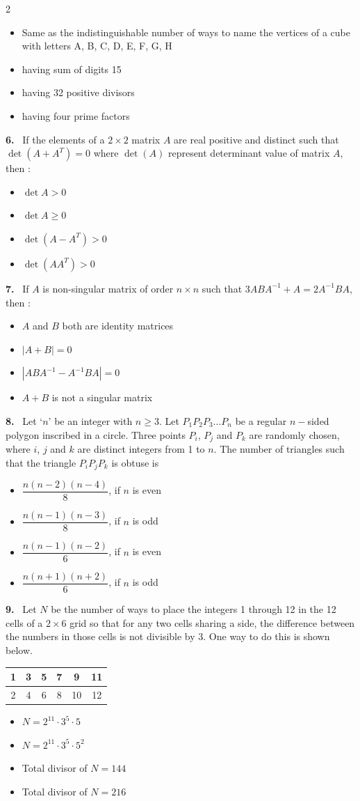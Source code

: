 \documentclass[10pt]{extarticle}
\newcommand{\qn}[1]{\par\smallskip\noindent\textbf{#1.}~}
\newenvironment{qoptions}{\begin{itemize}[leftmargin=1.8em,itemsep=1pt,topsep=2pt,label={}]}{\end{itemize}}
\newcommand{\opt}[2]{\item[(#1)] #2}
\begin{document}
\begin{multicols}{2}
\begin{qoptions}
\opt{A}{Same as the indistinguishable number of ways to name the vertices of a cube with letters A, B, C, D, E, F, G, H}
\opt{B}{having sum of digits 15}
\opt{C}{having 32 positive divisors}
\opt{D}{having four prime factors}
\end{qoptions}
\qn{6} If the elements of a $2\times2$ matrix $A$ are real positive and distinct such that $\det(A+A^T)=0$ where $\det(A)$ represent determinant value of matrix $A$, then :
\begin{qoptions}
\opt{A}{$\det A>0$}
\opt{B}{$\det A\ge0$}
\opt{C}{$\det(A-A^T)>0$}
\opt{D}{$\det(AA^T)>0$}
\end{qoptions}
\qn{7} If $A$ is non-singular matrix of order $n\times n$ such that $3ABA^{-1}+A=2A^{-1}BA$, then :
\begin{qoptions}
\opt{A}{$A$ and $B$ both are identity matrices}
\opt{B}{$|A+B|=0$}
\opt{C}{$|ABA^{-1}-A^{-1}BA|=0$}
\opt{D}{$A+B$ is not a singular matrix}
\end{qoptions}
\qn{8} Let `$n$' be an integer with $n\ge3$. Let $P_1P_2P_3\ldots P_n$ be a regular $n-$sided polygon inscribed in a circle. Three points $P_i$, $P_j$ and $P_k$ are randomly chosen, where $i$, $j$ and $k$ are distinct integers from 1 to $n$. The number of triangles such that the triangle $P_iP_jP_k$ is obtuse is
\begin{qoptions}
\opt{A}{$\dfrac{n(n-2)(n-4)}{8}$, if $n$ is even}
\opt{B}{$\dfrac{n(n-1)(n-3)}{8}$, if $n$ is odd}
\opt{C}{$\dfrac{n(n-1)(n-2)}{6}$, if $n$ is even}
\opt{D}{$\dfrac{n(n+1)(n+2)}{6}$, if $n$ is odd}
\end{qoptions}
\qn{9} Let $N$ be the number of ways to place the integers 1 through 12 in the 12 cells of a $2\times6$ grid so that for any two cells sharing a side, the difference between the numbers in those cells is not divisible by 3. One way to do this is shown below.
\begin{center}
\renewcommand{\arraystretch}{1.4}\setlength{\tabcolsep}{5pt}\footnotesize
\begin{tabular}{|c|c|c|c|c|c|}\hline
1&3&5&7&9&11\\\hline
2&4&6&8&10&12\\\hline
\end{tabular}
\end{center}
\begin{qoptions}
\opt{A}{$N=2^{11}\cdot3^5\cdot5$}
\opt{B}{$N=2^{11}\cdot3^5\cdot5^2$}
\opt{C}{Total divisor of $N=144$}
\opt{D}{Total divisor of $N=216$}
\end{qoptions}

\end{multicols}
\end{document}
